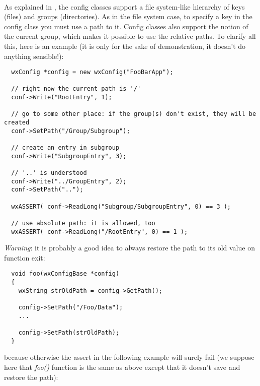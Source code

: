 \label{congigconstructordestructor}

\\


\label{configpathmanagement}

As explained in , the config classes
support a file system-like hierarchy of keys (files) and groups (directories).
As in the file system case, to specify a key in the config class you must use
a path to it. Config classes also support the notion of the current group,
which makes it possible to use the relative paths. To clarify all this, here
is an example (it is only for the sake of demonstration, it doesn't do anything
sensible!):

\begin{verbatim}
  wxConfig *config = new wxConfig("FooBarApp");

  // right now the current path is '/'
  conf->Write("RootEntry", 1);

  // go to some other place: if the group(s) don't exist, they will be created
  conf->SetPath("/Group/Subgroup");

  // create an entry in subgroup
  conf->Write("SubgroupEntry", 3);

  // '..' is understood
  conf->Write("../GroupEntry", 2);
  conf->SetPath("..");

  wxASSERT( conf->ReadLong("Subgroup/SubgroupEntry", 0) == 3 );

  // use absolute path: it is allowed, too
  wxASSERT( conf->ReadLong("/RootEntry", 0) == 1 );
\end{verbatim}

{\it Warning}: it is probably a good idea to always restore the path to its
old value on function exit:

\begin{verbatim}
  void foo(wxConfigBase *config)
  {
    wxString strOldPath = config->GetPath();

    config->SetPath("/Foo/Data");
    ...

    config->SetPath(strOldPath);
  }
\end{verbatim}

because otherwise the assert in the following example will surely fail
(we suppose here that {\it foo()} function is the same as above except that it
doesn't save and restore the path):

